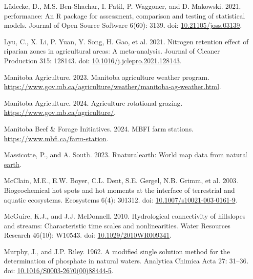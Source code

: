 \documentclass[
]{agujournal2019}
\newlength{\cslhangindent}
\newenvironment{CSLReferences}[2] %
 {\begin{list}{}{%
  \setlength{\itemindent}{0pt}
  \setlength{\leftmargin}{0pt}
  \setlength{\parsep}{0pt}
  \ifodd #1
   \setlength{\leftmargin}{\cslhangindent}
   \setlength{\itemindent}{-1\cslhangindent}
  \fi
  \setlength{\itemsep}{#2\baselineskip}}}
 {\end{list}}
\begin{document}
\begin{CSLReferences}{1}{1}
Lüdecke, D., M.S. Ben-Shachar, I. Patil, P. Waggoner, and D. Makowski.
2021. {performance}: An {R} package for assessment, comparison and
testing of statistical models. Journal of Open Source Software 6(60):
3139. doi:
\href{https://doi.org/10.21105/joss.03139}{10.21105/joss.03139}.

Lyu, C., X. Li, P. Yuan, Y. Song, H. Gao, et al. 2021. Nitrogen
retention effect of riparian zones in agricultural areas: A
meta-analysis. Journal of Cleaner Production 315: 128143. doi:
\href{https://doi.org/10.1016/j.jclepro.2021.128143}{10.1016/j.jclepro.2021.128143}.

Manitoba Agriculture. 2023. Manitoba agriculture weather program.
\url{https://www.gov.mb.ca/agriculture/weather/manitoba-ag-weather.html}.

Manitoba Agriculture. 2024. Agriculture rotational grazing.
\url{https://www.gov.mb.ca/agriculture/}.

Manitoba Beef \& Forage Initiatives. 2024. MBFI farm stations.
\url{https://www.mbfi.ca/farm-station}.

Massicotte, P., and A. South. 2023.
\href{https://CRAN.R-project.org/package=rnaturalearth}{Rnaturalearth:
World map data from natural earth}.

McClain, M.E., E.W. Boyer, C.L. Dent, S.E. Gergel, N.B. Grimm, et al.
2003. Biogeochemical hot spots and hot moments at the interface of
terrestrial and aquatic ecosystems. Ecosystems 6(4): 301312. doi:
\href{https://doi.org/10.1007/s10021-003-0161-9}{10.1007/s10021-003-0161-9}.

McGuire, K.J., and J.J. McDonnell. 2010. Hydrological connectivity of
hillslopes and streams: Characteristic time scales and nonlinearities.
Water Resources Research 46(10): W10543. doi:
\href{https://doi.org/10.1029/2010WR009341}{10.1029/2010WR009341}.

Murphy, J., and J.P. Riley. 1962. A modified single solution method for
the determination of phosphate in natural waters. Analytica Chimica Acta
27: 31--36. doi:
\href{https://doi.org/10.1016/S0003-2670(00)88444-5}{10.1016/S0003-2670(00)88444-5}.


\end{CSLReferences}
\end{document}
